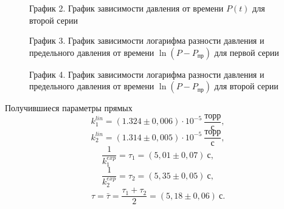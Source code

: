 \documentclass[a4paper]{article}
\begin{document}
\begin{enumerate}
\begin{figure}[h!]
\caption[]{\label{} График 2. График зависимости давления от времени $P(t)$ для второй серии}
\end{figure}
\clearpage
\begin{figure}[h!]
\caption[]{\label{} График 3. График зависимости логарифма разности давления и предельного давления от времени $\ln(P - P_{\text{пр}})$ для первой серии}
\end{figure}
\begin{figure}[h!]
\caption[]{\label{} График 4. График зависимости логарифма разности давления и предельного давления от времени $\ln(P - P_{\text{пр}})$ для второй серии}
\end{figure}
\clearpage
Получившиеся параметры прямых
\begin{equation*}
    k_1^{lin} = (1.324 \pm 0,006) \cdot 10^{-5} \ \frac{\text{торр}}{\text{с}}, 
\end{equation*}
\begin{equation*}
    k_2^{lin} = (1.314 \pm 0,005) \cdot 10^{-5} \ \frac{\text{торр}}{\text{с}}, 
\end{equation*}
\begin{equation*}
    \frac{1}{k_1^{exp}} = \tau_1 = (5,01 \pm 0,07) \ \text{с}, 
\end{equation*}
\begin{equation*}
    \frac{1}{k_2^{exp}} = \tau_2 = (5,35 \pm 0,05) \ \text{с},
\end{equation*}
\begin{equation*}
    \tau = \bar{\tau} = \frac{\tau_1 + \tau_2}{2} = (5,18 \pm 0,06) \ \text{с}.
\end{equation*}


\end{enumerate}
\end{document}
